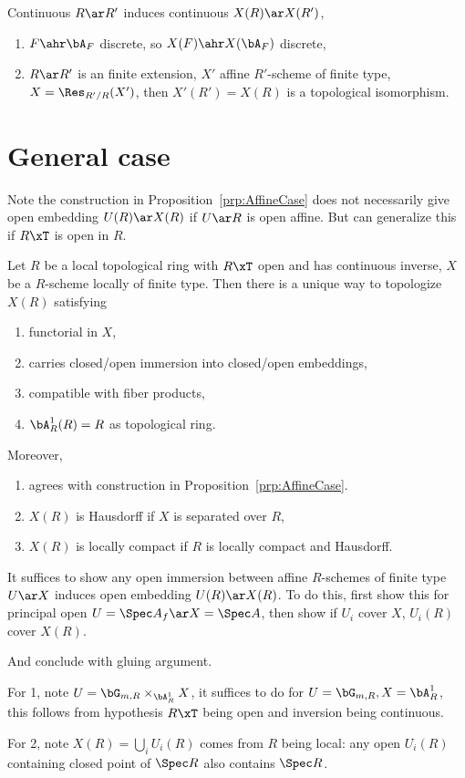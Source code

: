 \begin{exg}
  Continuous $R\ar R'$ induces continuous $X(R)\ar X(R')$,
  \begin{enumerate}
    \item $F\ahr\bA_{F}$ discrete, so $X(F)\ahr X(\bA_{F})$ discrete,
    \item $R\ar R'$ is an finite extension, $X'$ affine $R'$-scheme of finite type, $X=\Res_{R'/R}(X')$, then $X'(R')=X(R)$ is a topological isomorphism.
  \end{enumerate}
\end{exg}


\section{General case}

\begin{qst}
  Note the construction in Proposition~\ref{prp:AffineCase} does not necessarily give open embedding $U(R)\ar X(R)$ if $U\ar R$ is open affine. But can generalize this if $R\xT$ is open in $R$.
\end{qst}

\begin{prp}\label{prp:GeneralCase}
  Let $R$ be a local topological ring with $R\xT$ open and has continuous inverse, $X$ be a $R$-scheme locally of finite type. Then there is a unique way to topologize $X(R)$ satisfying
  \begin{enumerate}
    \item functorial in $X$,
    \item carries closed/open immersion into closed/open embeddings,
    \item compatible with fiber products,
    \item $\bA_{R}^{1}(R)=R$ as topological ring.
  \end{enumerate}
  Moreover,
  \begin{enumerate}
    \item agrees with construction in Proposition~\ref{prp:AffineCase}.
    \item $X(R)$ is Hausdorff if $X$ is separated over $R$,
    \item $X(R)$ is locally compact if $R$ is locally compact and Hausdorff.
  \end{enumerate}
\end{prp}

\begin{prf}
  It suffices to show any open immersion between affine $R$-schemes of finite type $U\ar X$ induces open embedding $U(R)\ar X(R)$. To do this, first show this for principal open $U=\Spec A_{f}\ar X=\Spec A$, then show if $U_{i}$ cover $X$, $U_{i}(R)$ cover $X(R)$.

  And conclude with gluing argument.


  For 1, note $U=\bG_{m,R}\times_{\bA_{R}^{1}}X$, it suffices to do for $U=\bG_{m,R}, X=\bA_{R}^{1}$, this follows from hypothesis $R\xT$ being open and inversion being continuous.

  For 2, note $X(R)=\bigcup_{i}U_{i}(R)$ comes from $R$ being local: any open $U_{i}(R)$ containing closed point of $\Spec R$ also contains $\Spec R$.
\end{prf}

